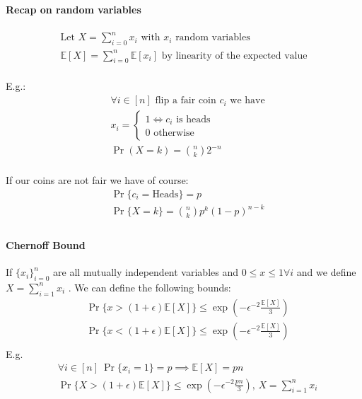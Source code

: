 \documentclass[]{article}
\begin{document}
\paragraph{Recap on random variables}
\begin{align*}
\text{Let } X = \sum_{i=0}^{n}x_i \text{ with }x_i \text{ random variables}\\
\mathbb{E}[X] = \sum_{i=0}^{n} \mathbb{E}[x_i] \text{ by linearity of the expected value}\\
\end{align*}

E.g.:
\begin{align*}
	&\forall i \in [n] \text{ flip a fair coin }c_i \text{ we have}\\
	&x_i = \begin{cases}
		1 \iff c_i \text{ is heads}\\
		0 \text{ otherwise}
	\end{cases}\\
	&\Pr( X = k) = {n \choose k}2^{-n}\\
\end{align*}

If our coins are not fair we have of course:
\begin{align*}
&\Pr\{c_i = \text{Heads}\} = p\\
&\Pr\{X = k \} = {n \choose k}p^{k}(1-p)^{n-k}\\
\end{align*}

\paragraph{Chernoff Bound}
If $\{x_i\}_{i=0}^{n}$ are all mutually independent variables and $0\leq x \leq 1 \forall i$ and we define $X = \sum_{i=1}^{n} x_i$ . We can define the following bounds:
\begin{align*}
&\Pr\{x > (1+\epsilon) \mathbb{E}[X]\} \leq \exp({-\epsilon}^{-2} \frac{\mathbb{E}[X]}{3}) \\
&\Pr\{x < (1+\epsilon) \mathbb{E}[X]\} \leq \exp({-\epsilon}^{-2} \frac{\mathbb{E}[X]}{3}) \\
\end{align*}
E.g.
\begin{align*}
&\forall i \in [n]\ \Pr\{x_i = 1\} = p  \implies \mathbb{E}[X] = pn\\
&\Pr\{X > (1+\epsilon) \mathbb{E}[X]\} \leq \exp\left({-\epsilon}^{-2} \frac{pn}{3}\right),\, X = \sum_{i=1}^{n} x_i \\
\end{align*}
\end{document}
